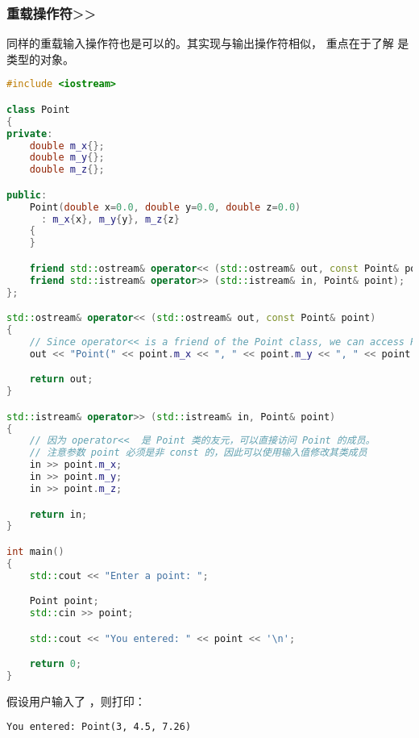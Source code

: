 \documentclass[../../LearnCpp.tex]{subfiles}
\begin{document}
\subsubsection*{重载操作符>>}

同样的重载输入操作符也是可以的。其实现与输出操作符相似，
重点在于了解  是  类型的对象。

\begin{lstlisting}[language=C++]
#include <iostream>

class Point
{
private:
    double m_x{};
    double m_y{};
    double m_z{};

public:
    Point(double x=0.0, double y=0.0, double z=0.0)
      : m_x{x}, m_y{y}, m_z{z}
    {
    }

    friend std::ostream& operator<< (std::ostream& out, const Point& point);
    friend std::istream& operator>> (std::istream& in, Point& point);
};

std::ostream& operator<< (std::ostream& out, const Point& point)
{
    // Since operator<< is a friend of the Point class, we can access Point's members directly.
    out << "Point(" << point.m_x << ", " << point.m_y << ", " << point.m_z << ')';

    return out;
}

std::istream& operator>> (std::istream& in, Point& point)
{
    // 因为 operator<<  是 Point 类的友元，可以直接访问 Point 的成员。
    // 注意参数 point 必须是非 const 的，因此可以使用输入值修改其类成员
    in >> point.m_x;
    in >> point.m_y;
    in >> point.m_z;

    return in;
}

int main()
{
    std::cout << "Enter a point: ";

    Point point;
    std::cin >> point;

    std::cout << "You entered: " << point << '\n';

    return 0;
}
\end{lstlisting}

假设用户输入了 ，则打印：

\begin{lstlisting}
You entered: Point(3, 4.5, 7.26)
\end{lstlisting}
\end{document}
